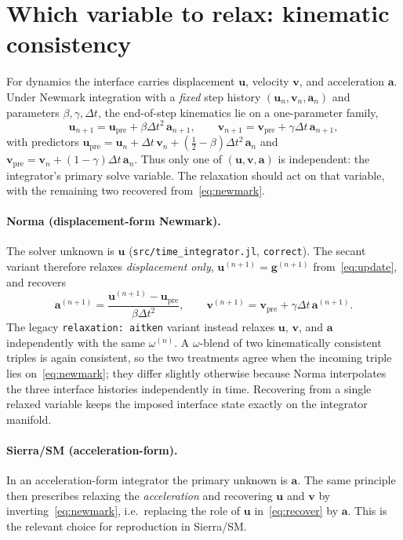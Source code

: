 \documentclass[11pt]{article}
\begin{document}
\section{Which variable to relax: kinematic consistency}
\label{sec:fields}

For dynamics the interface carries displacement $\bm{u}$, velocity $\bm{v}$,
and acceleration $\bm{a}$. Under Newmark integration with a \emph{fixed}
step history $(\bm{u}_n,\bm{v}_n,\bm{a}_n)$ and parameters $\beta,\gamma,\Delta
t$, the end-of-step kinematics lie on a one-parameter family,
\begin{equation}
    \bm{u}_{n+1} = \bm{u}_{\mathrm{pre}} + \beta\Delta t^2\,\bm{a}_{n+1},
    \qquad
    \bm{v}_{n+1} = \bm{v}_{\mathrm{pre}} + \gamma\Delta t\,\bm{a}_{n+1},
    \label{eq:newmark}
\end{equation}
with predictors
$\bm{u}_{\mathrm{pre}} = \bm{u}_n + \Delta t\,\bm{v}_n
 + (\tfrac12 - \beta)\Delta t^2\,\bm{a}_n$ and
$\bm{v}_{\mathrm{pre}} = \bm{v}_n + (1-\gamma)\Delta t\,\bm{a}_n$.
Thus only one of $(\bm{u},\bm{v},\bm{a})$ is independent: the integrator's
primary solve variable. The relaxation should act on that variable, with the
remaining two recovered from~\eqref{eq:newmark}.

\paragraph{Norma (displacement-form Newmark).}
The solver unknown is $\bm{u}$ (\texttt{src/time\_integrator.jl}, \texttt{correct}).
The secant variant therefore relaxes \emph{displacement only},
$\bm{u}^{(n+1)} = \bm{g}^{(n+1)}$ from~\eqref{eq:update}, and recovers
\begin{equation}
    \bm{a}^{(n+1)} = \frac{\bm{u}^{(n+1)} - \bm{u}_{\mathrm{pre}}}{\beta\Delta t^2},
    \qquad
    \bm{v}^{(n+1)} = \bm{v}_{\mathrm{pre}} + \gamma\Delta t\,\bm{a}^{(n+1)} .
    \label{eq:recover}
\end{equation}
The legacy \texttt{relaxation: aitken} variant instead relaxes
$\bm{u}$, $\bm{v}$, and $\bm{a}$ independently with the same $\omega^{(n)}$. A
$\omega$-blend of two kinematically consistent triples is again consistent, so
the two treatments agree when the incoming triple lies on~\eqref{eq:newmark};
they differ slightly otherwise because Norma interpolates the three interface
histories independently in time. Recovering from a single relaxed variable
keeps the imposed interface state exactly on the integrator manifold.

\paragraph{Sierra/SM (acceleration-form).}
In an acceleration-form integrator the primary unknown is $\bm{a}$. The same
principle then prescribes relaxing the \emph{acceleration} and recovering
$\bm{u}$ and $\bm{v}$ by inverting~\eqref{eq:newmark}, i.e.\ replacing the role
of $\bm{u}$ in~\eqref{eq:recover} by $\bm{a}$. This is the relevant choice for
reproduction in Sierra/SM.
\end{document}
